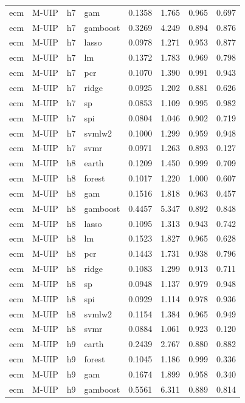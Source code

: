 \begin{ThreePartTable}
\begin{longtable}[t]{llclcccc}
ecm & M-UIP & h7 & gam & 0.1358 & 1.765 & 0.965 & 0.697\\
ecm & M-UIP & h7 & gamboost & 0.3269 & 4.249 & 0.894 & 0.876\\
ecm & M-UIP & h7 & lasso & 0.0978 & 1.271 & 0.953 & 0.877\\
ecm & M-UIP & h7 & lm & 0.1372 & 1.783 & 0.969 & 0.798\\
ecm & M-UIP & h7 & pcr & 0.1070 & 1.390 & 0.991 & 0.943\\
ecm & M-UIP & h7 & ridge & 0.0925 & 1.202 & 0.881 & 0.626\\
ecm & M-UIP & h7 & sp & 0.0853 & 1.109 & 0.995 & 0.982\\
ecm & M-UIP & h7 & spi & 0.0804 & 1.046 & 0.902 & 0.719\\
ecm & M-UIP & h7 & svmlw2 & 0.1000 & 1.299 & 0.959 & 0.948\\
ecm & M-UIP & h7 & svmr & 0.0971 & 1.263 & 0.893 & 0.127\\
\addlinespace
ecm & M-UIP & h8 & earth & 0.1209 & 1.450 & 0.999 & 0.709\\
ecm & M-UIP & h8 & forest & 0.1017 & 1.220 & 1.000 & 0.607\\
ecm & M-UIP & h8 & gam & 0.1516 & 1.818 & 0.963 & 0.457\\
ecm & M-UIP & h8 & gamboost & 0.4457 & 5.347 & 0.892 & 0.848\\
ecm & M-UIP & h8 & lasso & 0.1095 & 1.313 & 0.943 & 0.742\\
ecm & M-UIP & h8 & lm & 0.1523 & 1.827 & 0.965 & 0.628\\
ecm & M-UIP & h8 & pcr & 0.1443 & 1.731 & 0.938 & 0.796\\
ecm & M-UIP & h8 & ridge & 0.1083 & 1.299 & 0.913 & 0.711\\
ecm & M-UIP & h8 & sp & 0.0948 & 1.137 & 0.979 & 0.948\\
ecm & M-UIP & h8 & spi & 0.0929 & 1.114 & 0.978 & 0.936\\
ecm & M-UIP & h8 & svmlw2 & 0.1154 & 1.384 & 0.965 & 0.949\\
ecm & M-UIP & h8 & svmr & 0.0884 & 1.061 & 0.923 & 0.120\\
\addlinespace
ecm & M-UIP & h9 & earth & 0.2439 & 2.767 & 0.880 & 0.882\\
ecm & M-UIP & h9 & forest & 0.1045 & 1.186 & 0.999 & 0.336\\
ecm & M-UIP & h9 & gam & 0.1674 & 1.899 & 0.958 & 0.340\\
ecm & M-UIP & h9 & gamboost & 0.5561 & 6.311 & 0.889 & 0.814\\

\end{longtable}
\end{ThreePartTable}
